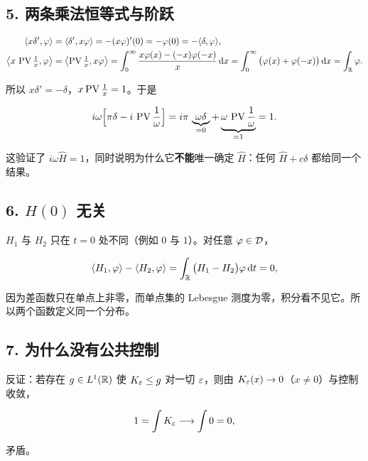 \subsection*{5. 两条乘法恒等式与阶跃}

\begin{align}
\langle x\delta',\varphi\rangle&=\langle \delta',x\varphi\rangle=-(x\varphi)'(0)=-\varphi(0)=-\langle \delta,\varphi\rangle,\\
\left\langle x\,\operatorname{PV}\tfrac1x,\varphi\right\rangle
&=\left\langle \operatorname{PV}\tfrac1x,x\varphi\right\rangle
=\int_{0}^{\infty}\frac{x\varphi(x)-(-x)\varphi(-x)}{x}\mathop{}\!\mathrm{d} x
=\int_{0}^{\infty}\big(\varphi(x)+\varphi(-x)\big)\mathop{}\!\mathrm{d} x=\int_{\mathbb{R}}\varphi .
\end{align}

所以 $x\delta'=-\delta$，$x\operatorname{PV}\frac1x=1$。于是

\begin{equation}
i\omega\Big[\pi\delta-i\,\operatorname{PV}\frac{1}{\omega}\Big]
=i\pi\,\underbrace{\omega\delta}_{=0}+\underbrace{\omega\,\operatorname{PV}\frac{1}{\omega}}_{=1}=1 .
\end{equation}

这验证了 $i\omega\widehat H=1$，同时说明为什么它\textbf{不能}唯一确定 $\widehat H$：任何 $\widehat H+c\delta$ 都给同一个结果。

\subsection*{6. $H(0)$ 无关}

$H_1$ 与 $H_2$ 只在 $t=0$ 处不同（例如 $0$ 与 $1$）。对任意 $\varphi\in\mathcal{D}$，

\begin{equation}
\langle H_1,\varphi\rangle-\langle H_2,\varphi\rangle=\int_{\mathbb{R}}\big(H_1-H_2\big)\varphi\mathop{}\!\mathrm{d} t=0,
\end{equation}

因为差函数只在单点上非零，而单点集的 Lebesgue 测度为零，积分看不见它。所以两个函数定义同一个分布。

\subsection*{7. 为什么没有公共控制}

反证：若存在 $g\in L^1(\mathbb{R})$ 使 $K_\varepsilon\le g$ 对一切 $\varepsilon$，则由 $K_\varepsilon(x)\to0$（$x\neq0$）与控制收敛，

\begin{equation}
1=\int K_\varepsilon\longrightarrow\int 0=0,
\end{equation}

矛盾。

